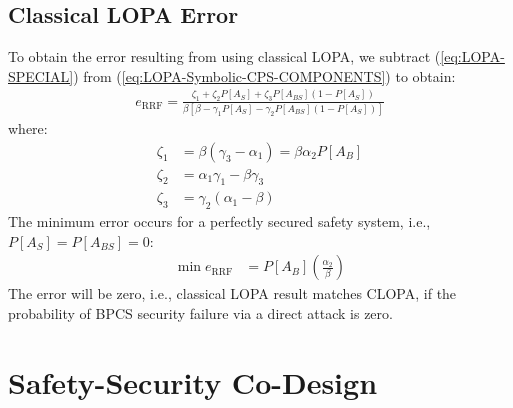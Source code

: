 \documentclass[journal]{IEEEtran}
\begin{document}
\subsection{Classical LOPA Error}
To obtain the error resulting from using classical LOPA, we subtract (\ref{eq:LOPA-SPECIAL}) from (\ref{eq:LOPA-Symbolic-CPS-COMPONENTS}) to obtain:
\begin{align}
e_{\text{RRF}} = \frac{\zeta_1 + \zeta_2 P[A_S] + \zeta_3 P[A_{BS}] (1 - P[A_S])}{\beta \left[ \beta - \gamma_1 P[A_S] - \gamma_2 P[A_{BS}] (1- P[A_S]) \right]}
\label{eq:LOPA-Error}
\end{align}
where:
\begin{align}
\zeta_1 &= \beta (\gamma_3 - \alpha_1) = \beta \alpha_2 P[A_B] \label{eq:zeta1}\\
\zeta_2 &= \alpha_1 \gamma_1 - \beta \gamma_3 \label{eq:zeta2}\\
\zeta_3 &= \gamma_2 (\alpha_1 - \beta) \label{eq:zeta3}
\end{align}
The minimum error occurs for a perfectly secured safety system, i.e., $P[A_S]=P[A_{BS}]=0$:
\begin{align}
\min e_{\text{RRF}} &= P[A_B] \left(\frac{\alpha_2}{\beta} \right) 
\end{align}
The error will be zero, i.e., classical LOPA result matches CLOPA, if the probability of BPCS security failure via a direct attack is zero.

\section{Safety-Security Co-Design} \label{sec:co-design}
\end{document}
